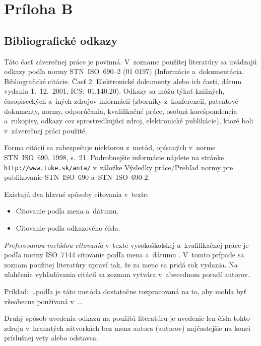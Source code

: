 \section*{Príloha B}
\subsection*{Bibliografické odkazy}

Táto časť záverečnej práce je povinná. V~zozname použitej literatúry
sa uvádzajú odkazy podľa normy STN~ISO~690--2 (01 0197) (Informácie
a~dokumentácia. Bibliografické citácie. Časť 2: Elektronické
dokumenty alebo ich časti, dátum vydania 1.~12.~2001, ICS:~01.140.20).
Odkazy sa môžu týkať knižných, časopiseckých a~iných zdrojov
informácií (zborníky z~konferencií, patentové dokumenty, normy,
odporúčania, kvalifikačné práce, osobná korešpondencia a~rukopisy,
odkazy cez sprostredkujúci zdroj, elektronické publikácie), ktoré boli
v~záverečnej práci použité.

Forma citácií sa zabezpečuje niektorou z~metód, opísaných v~norme
STN~ISO~690, 1998, s.~21. Podrobnejšie informácie nájdete na stránke
\texttt{http://www.tuke.sk/anta/} v~záložke {\small\sf Výsledky
práce/Prehľad normy pre publikovanie STN~ISO~690 a~STN~ISO~690-2}.

Existujú dva hlavné spôsoby citovania v~texte.

\begin{itemize}
\item Citovanie podľa mena a~dátumu.
\item Citovanie podľa odkazového čísla.
\end{itemize}

\emph{Preferovanou metódou citovania} v~texte vysokoškolskej
a~kvalifikačnej práce je podľa normy ISO~7144 citovanie podľa mena
a~dátumu \citep{kat,gonda}. V~tomto prípade sa zoznam použitej
literatúry upraví tak, že za meno sa pridá rok vydania. Na uľahčenie
vyhľadávania citácií sa zoznam vytvára v~abecednom poradí autorov.

\medskip

Príklad:
\dots podľa \citep{steinerova} je táto metóda dostatočne rozpracovaná
na to, aby mohla byť všeobecne používaná v~\dots

\medskip

Druhý spôsob uvedenia odkazu na použitú literatúru je uvedenie len
čísla tohto zdroja v~hranatých zátvorkách bez mena autora (autorov)
najčastejšie na konci príslušnej vety alebo odstavca.

